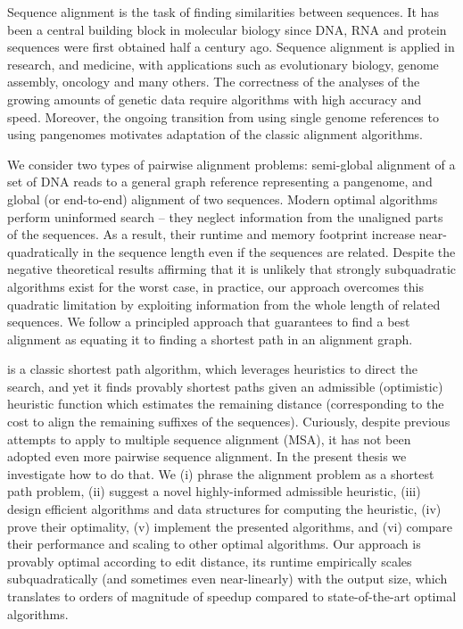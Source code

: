 Sequence alignment is the task of finding similarities between sequences. It has
been a central building block in molecular biology since DNA, RNA and protein
sequences were first obtained half a century ago. Sequence alignment is applied
in research, and medicine, with applications such as evolutionary biology,
genome assembly, oncology and many others. The correctness of the analyses of
the growing amounts of genetic data require algorithms with high accuracy and
speed. Moreover, the ongoing transition from using single genome references to
using pangenomes motivates adaptation of the classic alignment algorithms.

We consider two types of pairwise alignment problems: semi-global alignment of a
set of DNA reads to a general graph reference representing a pangenome, and
global (or end-to-end) alignment of two sequences. Modern optimal algorithms
perform uninformed search -- they neglect information from the unaligned parts of
the sequences. As a result, their runtime and memory footprint increase
near-quadratically in the sequence length even if the sequences are related.
Despite the negative theoretical results affirming that it is unlikely that
strongly subquadratic algorithms exist for the worst case, in practice, our
approach overcomes this quadratic limitation by exploiting information from the
whole length of related sequences. We follow a principled approach that
guarantees to find a best alignment as equating it to finding a shortest path in
an alignment graph.

\A is a classic shortest path algorithm, which leverages heuristics to direct
the search, and yet it finds provably shortest paths given an admissible
(optimistic) heuristic function which estimates the remaining distance
(corresponding to the cost to align the remaining suffixes of the sequences).
Curiously, despite previous attempts to apply \A to multiple sequence alignment
(MSA), it has not been adopted even more pairwise sequence alignment. In the
present thesis we investigate how to do that. We (i) phrase the alignment
problem as a shortest path problem, (ii) suggest a novel highly-informed
admissible heuristic, (iii) design efficient algorithms and data structures for
computing the heuristic, (iv) prove their optimality, (v) implement the
presented algorithms, and (vi) compare their performance and scaling to other
optimal algorithms. Our approach is provably optimal according to edit distance,
its runtime empirically scales subquadratically (and sometimes even
near-linearly) with the output size, which translates to orders of magnitude of
speedup compared to state-of-the-art optimal algorithms.


